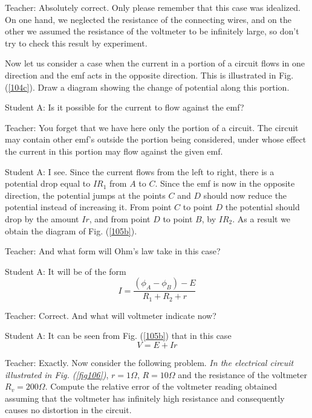 \documentclass[a4paper,12pt]{book}
\begin{document}
{\sc Teacher:} Absolutely correct. Only please remember that this case was idealized. On one hand, we neglected the resistance of the connecting wires, and on the other we assumed the resistance of the voltmeter to be infinitely large, so don't try to check this result by experiment.

Now let us consider a case when the current in a portion of  a circuit flows in one direction and the emf acts in the opposite direction. This is illustrated in Fig. (\ref{104c}). Draw a diagram showing the change of potential along this portion.

{\sc Student A:} Is it possible for the current to flow against the emf?

{\sc Teacher:} You forget that we have here only the portion of a circuit. The circuit may contain other emf's outside the portion being considered, under whose effect the current in this portion may flow against the given emf.

{\sc Student A:} I see. Since the current flows from the left to right, there is a potential drop equal to $IR_{1}$ from $A$ to $C$. Since the emf is now in the opposite direction, the potential jumps at the points $C$ and $D$ should now reduce the potential instead of increasing it. From point $C$ to point $D$ the potential should drop by the amount $Ir$, and from point $D$ to point $B$, by $IR_{2}$. As a result we obtain the diagram of Fig. (\ref{105b}).

{\sc Teacher:} And what form will Ohm's law take in this case?

{\sc Student A:} It will be of the form
\begin{equation}
I = \frac{ (\phi_{A} - \phi_{B}) - E}{R_{1}+R_{2}+r} \label{168}
\end{equation}


{\sc Teacher:} Correct. And what will voltmeter indicate now?

{\sc Student A:} It can be seen from Fig. (\ref{105b}) that in this case
\begin{equation}
V = E + Ir
\end{equation}

{\sc Teacher:} Exactly. Now consider the following problem. \emph{ In the electrical circuit illustrated in Fig. (\ref{fig106})}, $r=1 \Omega$, $R = 10 \Omega$ and the resistance of the voltmeter $R_{v} = 200 \Omega$. Compute the relative error of the voltmeter reading obtained assuming that the voltmeter has infinitely high resistance and consequently causes no distortion in the circuit.
\end{document}
